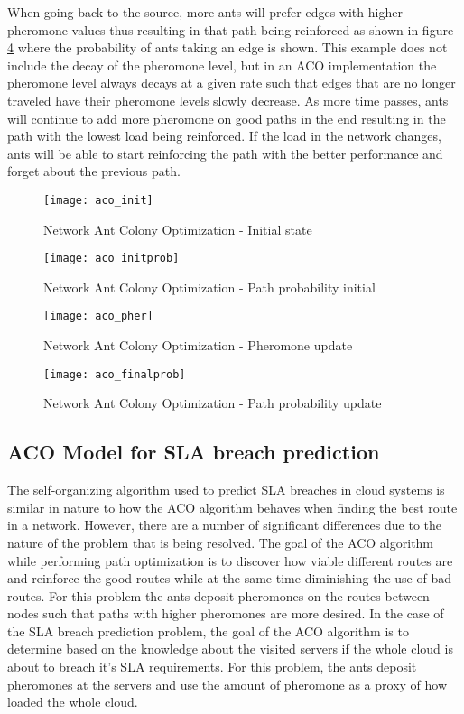 \documentclass[conference]{IEEEtran}
\begin{document}
When going back to the source, more ants will prefer edges with higher pheromone values thus resulting in that path being reinforced as shown in figure \ref{fig:aco_finalprob} where the probability of ants taking an edge is shown. This example does not include the decay of the pheromone level, but in an ACO implementation the pheromone level always decays at a given rate such that edges that are no longer traveled have their pheromone levels slowly decrease. As more time passes, ants will continue to add more pheromone on good paths in the end resulting in the path with the lowest load being reinforced. If the load in the network changes, ants will be able to start reinforcing the path with the better performance and forget about the previous path.

\begin{figure}
	\centering
	\texttt{[image: aco\_init]}
	\caption{Network Ant Colony Optimization - Initial state}
	\label{fig:aco_init}
\end{figure}

\begin{figure}
	\centering
	\texttt{[image: aco\_initprob]}
	\caption{Network Ant Colony Optimization - Path probability initial}
	\label{fig:aco_initprob}
\end{figure}

\begin{figure}
	\centering
	\texttt{[image: aco\_pher]}
	\caption{Network Ant Colony Optimization - Pheromone update}
	\label{fig:aco_pher}
\end{figure}

\begin{figure}
	\centering
	\texttt{[image: aco\_finalprob]}
	\caption{Network Ant Colony Optimization - Path probability update}
	\label{fig:aco_finalprob}
\end{figure}

\subsection{ACO Model for SLA breach prediction}

The self-organizing algorithm used to predict SLA breaches in cloud systems is similar in nature to how the ACO algorithm behaves when finding the best route in a network. However, there are a number of significant differences due to the nature of the problem that is being resolved. The goal of the ACO algorithm while performing path optimization is to discover how viable different routes are and reinforce the good routes while at the same time diminishing the use of bad routes. For this problem the ants deposit pheromones on the routes between nodes such that paths with higher pheromones are more desired. In the case of the SLA breach prediction problem, the goal of the ACO algorithm is to determine based on the knowledge about the visited servers if the whole cloud is about to breach it's SLA requirements. For this problem, the ants deposit pheromones at the servers and use the amount of pheromone as a proxy of how loaded the whole cloud.
\end{document}
